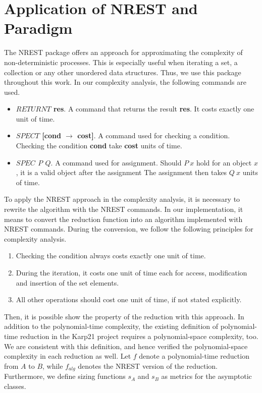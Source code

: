 \section{Application of NREST and Paradigm}
The NREST package offers an approach for approximating the complexity of non-deterministic processes.
This is especially useful when iterating a set, a collection or any other unordered data structures. Thus,
we use this package throughout this work. In our complexity analysis, the following commands are used. 
\begin{itemize}
    \item \textbf{$RETURNT$ res}. A command that returns the result \textbf{res}. It costs exactly one unit of time.
    \item \textbf{$SPECT$ [cond $\rightarrow$ cost]}. A command used for checking a condition. Checking the condition \textbf{cond}
    take \textbf{cost} units of time.
    \item \textbf{$SPEC$ $P$ $Q$}. A command used for assignment. Should $P\ x$ hold for an object $x$, it is a valid object after the assignment
    The assignment then takes $Q\ x$ units of time.
\end{itemize}
To apply the NREST approach in the complexity analysis, it is necessary to rewrite the algorithm with the NREST commands.
In our implementation, it means to convert the reduction function into an algorithm implemented with NREST commands.
During the conversion, we follow the following principles for complexity analysis.
\begin{enumerate}
    \label{para1}
    \item Checking the condition always costs exactly one unit of time. 
    \item During the iteration, it costs one unit of time each for access, modification and insertion of the set elements.
    \item All other operations should cost one unit of time, if not stated explicitly.
\end{enumerate}
Then, it is possible show the property of the reduction with this approach. In addition to the polynomial-time complexity, 
the existing definition of polynomial-time reduction in the Karp21 project requires a polynomial-space complexity, too. 
We are consistent with this definition, and hence verified the polynomial-space complexity in each reduction as well.
Let $f$ denote a polynomial-time reduction from $A$ to $B$, while $f_{alg}$ denotes the NREST version of the reduction.
Furthermore, we define sizing functions $s_A$ and $s_B$ as metrics for the asymptotic classes.
